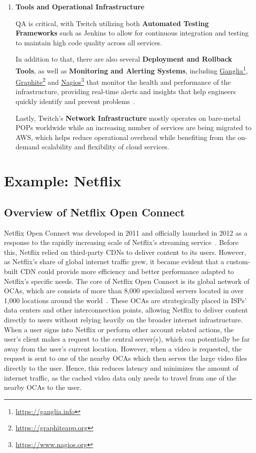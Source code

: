 \begin{enumerate}
    \item \textbf{Tools and Operational Infrastructure}

    \ac{QA} is critical, with Twitch utilizing both \textbf{Automated Testing Frameworks} such as Jenkins to allow for continuous integration and testing to maintain high code quality across all services.

    In addition to that, there are also several \textbf{Deployment and Rollback Tools}, as well as \textbf{Monitoring and Alerting Systems}, including \href{https://ganglia.info}{Ganglia}\footnote{\url{https://ganglia.info}}, \href{https://graphiteapp.org}{Graphite}\footnote{\url{https://graphiteapp.org}} and \href{https://www.nagios.org}{Nagios}\footnote{\url{https://www.nagios.org}} that monitor the health and performance of the infrastructure, providing real-time alerts and insights that help engineers quickly identify and prevent problems~\parencite{twitch_engineering}.

    Lastly, Twitch’s \textbf{Network Infrastructure} mostly operates on bare-metal \ac{POPs} worldwide while an increasing number of services are being migrated to \ac{AWS}, which helps reduce operational overhead while benefiting from the on-demand scalability and flexibility of cloud services.

\end{enumerate}

\section{Example: Netflix}


\subsection{Overview of Netflix Open Connect}

Netflix Open Connect was developed in 2011 and officially launched in 2012 as a response to the rapidly increasing scale of Netflix's streaming service~\parencite{netflix_functionality}. Before this, Netflix relied on third-party \ac{CDN}s to deliver content to its users. However, as Netflix's share of global internet traffic grew, it became evident that a custom-built \ac{CDN} could provide more efficiency and better performance adapted to Netflix's specific needs.
The core of Netflix Open Connect is its global network of \ac{OCAs}, which are consists of more than 8,000 specialized servers located in over 1,000 locations around the world~\parencite{netflix_open_connect}. These \ac{OCAs} are strategically placed in \ac{ISPs}' data centers and other interconnection points, allowing Netflix to deliver content directly to users without relying heavily on the broader internet infrastructure. 
When a user signs into Netflix or perform other account related actions, the user's client makes a request to the central server(s), which can potentially be far away from the user's current location. However, when a video is requested, the request is sent to one of the nearby \ac{OCAs} which then serves the large video files directly to the user. Hence, this reduces latency and minimizes the amount of internet traffic, as the cached video data only needs to travel from one of the nearby \ac{OCAs} to the user.

